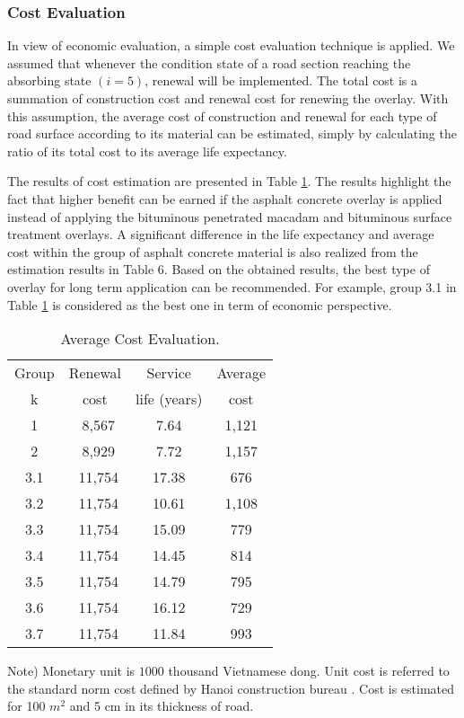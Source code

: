\subsubsection{Cost Evaluation}
\label{6622}
In view of economic evaluation, a simple cost evaluation technique is applied. We assumed that whenever the condition state of a road section reaching the absorbing state $(i=5)$, renewal will be implemented. The total cost is a summation of construction cost and renewal cost for renewing the overlay. With this assumption, the average cost of construction and renewal for each type of road surface according to its material can be estimated, simply by calculating the ratio of its total cost to its average life expectancy. 

The results of cost estimation are presented in Table \ref{table66}. The results highlight the fact that higher benefit can be earned if the asphalt concrete overlay is applied instead of applying the bituminous penetrated macadam and bituminous surface treatment overlays. A significant difference in the life expectancy and average cost within the group of asphalt concrete material is also realized from the estimation results in Table 6. Based on the obtained results, the best type of overlay for long term application can be recommended. For example, group 3.1 in Table \ref{table66} is considered as the best one in term of economic perspective. 

\begin{table}%
\begin{center}
\caption{Average Cost Evaluation.}
\label{table66}
{\small
\begin{tabular}{c|c|c|c}\hline
   Group&  Renewal & Service & Average \\
      k  & cost  & life (years)  & cost \\\hline
   1 &  ~8,567 & 7.64   & 1,121 \\
   2 &  ~8,929 & 7.72    & 1,157 \\
   3.1 &  ~11,754 & 17.38   & 676 \\
   3.2 &  ~11,754 & 10.61   & 1,108 \\
   3.3 &  ~11,754 & 15.09  & 779 \\
   3.4 &  ~11,754 & 14.45   & 814 \\
   3.5 &  ~11,754 & 14.79   & 795 \\
   3.6 &  ~11,754 & 16.12   & 729 \\
   3.7 &  ~11,754 & 11.84   & 993 \\
   \hline
\end{tabular}
}
\end{center}
{\small Note) Monetary unit is $1000$ thousand Vietnamese dong. Unit cost is referred to the standard norm cost defined by Hanoi construction bureau \cite{dghanoi08,dm1242}. Cost is estimated for 100 $m^2$ and 5 cm in its thickness of road.}
\end{table}
%
%

